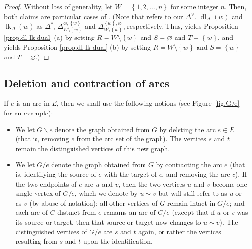 \documentclass[12pt]{amsart}
\theoremstyle{definition}
\DeclareMathOperator{\lk}{lk}
\DeclareMathOperator{\dl}{dl}
\begin{document}
\begin{proof}
Without loss of generality, let $W=\left\{  1,2,\ldots,n\right\}  $ for some
integer $n$. Then, both claims are particular cases of \cite[Lemma
1.1]{Floystad03}. (Note that \cite{Floystad03} refers to our $\Delta^{\vee}$,
$\dl_{\Delta}\left(  w\right)  $ and $\lk_{\Delta}\left(  w\right)  $ as
$\Delta^{\ast}$, $\Delta_{W\setminus\left\{  w\right\}  }^{\varnothing
,\left\{  w\right\}  }$ and $\Delta_{W\setminus\left\{  w\right\}  }^{\left\{
w\right\}  ,\varnothing}$, respectively. Thus, \cite[Lemma 1.1]{Floystad03}
yields Proposition \ref{prop.dl-lk-dual} (a) by setting $R=W\setminus\left\{
w\right\}  $ and $S=\varnothing$ and $T=\left\{  w\right\}  $, and yields
Proposition \ref{prop.dl-lk-dual} (b) by setting $R=W\setminus\left\{
w\right\}  $ and $S=\left\{  w\right\}  $ and $T=\varnothing$.)
\end{proof}

\subsection{\label{subsect.delcont.contract}Deletion and contraction of arcs}

If $e$ is an arc in $E$, then we shall use the following notions (see Figure~\ref{fig.G/e} for an example):
\begin{itemize}

\item We let $G \backslash e$ denote the graph obtained from $G$ by deleting the arc $e \in E$ (that is, removing $e$ from the arc set of the graph). The vertices $s$ and $t$ remain the distinguished vertices of this new graph.

\item We let $G / e$ denote the graph obtained from $G$ by contracting the arc $e$ (that is, identifying the source of $e$ with the target of $e$, and removing the arc $e$).
If the two endpoints of $e$ are $u$ and $v$, then
the two vertices $u$ and $v$ become one single vertex of $G / e$, which we denote by $u \sim v$ but will still refer to as $u$ or as $v$ (by abuse of notation);
all other vertices of $G$ remain intact in $G / e$;
and each arc of $G$ distinct from $e$ remains an arc of $G / e$ (except that if $u$ or $v$ was its source or target, then that source or target now changes to $u \sim v$).
The distinguished vertices of $G / e$ are $s$ and $t$ again, or rather the vertices resulting from $s$ and $t$ upon the identification.

\end{itemize}
\end{document}
